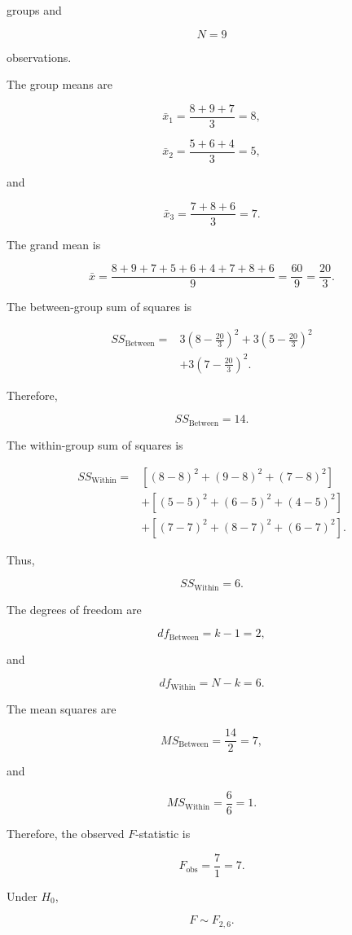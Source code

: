 \documentclass[11pt]{article}
\begin{document}
groups and

\[
N=9
\]

observations.

The group means are

\[
\bar{x}_1=\frac{8+9+7}{3}=8,
\]

\[
\bar{x}_2=\frac{5+6+4}{3}=5,
\]

and

\[
\bar{x}_3=\frac{7+8+6}{3}=7.
\]

The grand mean is

\[
\bar{x}
=
\frac{
8+9+7+5+6+4+7+8+6
}{
9
}
=
\frac{60}{9}
=
\frac{20}{3}.
\]

The between-group sum of squares is

\[
\begin{aligned}
SS_{\mathrm{Between}}
={}&
3\left(8-\frac{20}{3}\right)^2
+
3\left(5-\frac{20}{3}\right)^2\\
&+
3\left(7-\frac{20}{3}\right)^2.
\end{aligned}
\]

Therefore,

\[
SS_{\mathrm{Between}}=14.
\]

The within-group sum of squares is

\[
\begin{aligned}
SS_{\mathrm{Within}}
={}&
\left[(8-8)^2+(9-8)^2+(7-8)^2\right]\\
&+
\left[(5-5)^2+(6-5)^2+(4-5)^2\right]\\
&+
\left[(7-7)^2+(8-7)^2+(6-7)^2\right].
\end{aligned}
\]

Thus,

\[
SS_{\mathrm{Within}}=6.
\]

The degrees of freedom are

\[
df_{\mathrm{Between}}=k-1=2,
\]

and

\[
df_{\mathrm{Within}}=N-k=6.
\]

The mean squares are

\[
MS_{\mathrm{Between}}
=
\frac{14}{2}
=
7,
\]

and

\[
MS_{\mathrm{Within}}
=
\frac{6}{6}
=
1.
\]

Therefore, the observed \(F\)-statistic is

\[
\boxed{
F_{\mathrm{obs}}
=
\frac{7}{1}
=
7.
}
\]

Under \(H_0\),

\[
F\sim F_{2,6}.
\]
\end{document}
